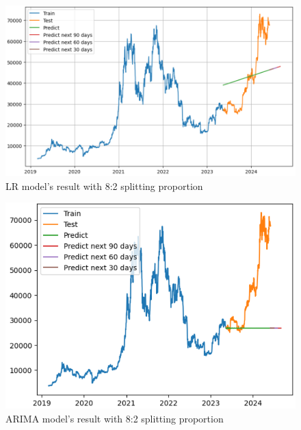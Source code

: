 \documentclass{ieeeojies}
\begin{document}
\begin{figure}[H]
	\centering
	\begin{minipage}{0.6\linewidth}
		\centering
		\includegraphics[width=\linewidth]{bibliography/Images/LR_BTC_82.PNG}
		\caption{LR model's result with 8:2 splitting proportion}
	\end{minipage}
\end{figure}
\begin{figure}[H]
	\centering
	\begin{minipage}{0.6\linewidth}
		\centering
		\includegraphics[width=\linewidth]{bibliography/Images/ARIMA_BTC_82.PNG}
		\caption{ARIMA model's result with 8:2 splitting proportion}
	\end{minipage}
\end{figure}
\end{document}
